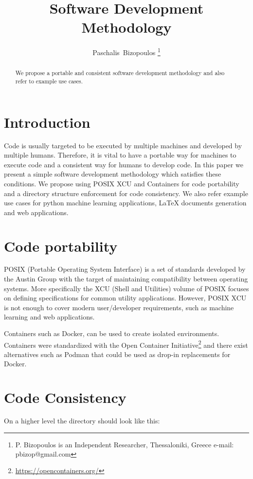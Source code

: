\documentclass[journal]{IEEEtran}
\begin{document}
\title{Software Development Methodology}

\author{Paschalis~Bizopoulos
\thanks{P. Bizopoulos is an Independent Researcher, Thessaloniki, Greece e-mail: pbizop@gmail.com}}

\maketitle

\begin{abstract}
	We propose a portable and consistent software development methodology and also refer to example use cases.
\end{abstract}

\section{Introduction}
Code is usually targeted to be executed by multiple machines and developed by multiple humans.
Therefore, it is vital to have a portable way for machines to execute code and a consistent way for humans to develop code.
In this paper we present a simple software development methodology which satisfies these conditions.
We propose using POSIX XCU and Containers for code portability and a directory structure enforcement for code consistency.
We also refer example use cases for python machine learning applications, \LaTeX{} documents generation and web applications.

\section{Code portability}
POSIX (Portable Operating System Interface) is a set of standards developed by the Austin Group with the target of maintaining compatibility between operating systems.
More specifically the XCU (Shell and Utilities) volume of POSIX focuses on defining specifications for common utility applications.
However, POSIX XCU is not enough to cover modern user/developer requirements, such as machine learning and web applications.

Containers such as Docker, can be used to create isolated environments.
Containers were standardized with the Open Container Initiative\footnote{\url{https://opencontainers.org/}} and there exist alternatives such as Podman that could be used as drop-in replacements for Docker.

\section{Code Consistency}
On a higher level the directory should look like this:
\end{document}
